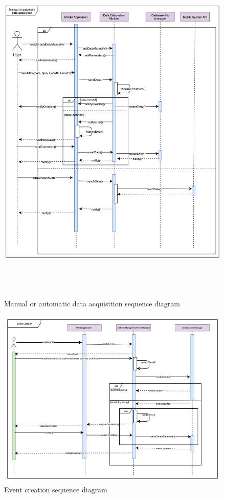 \begin{figure}[h!]
\centering
\includegraphics[height=17.00cm,keepaspectratio]{Figures/DataAcquisition}
\caption{Manual or automatic data acquisition sequence diagram}
\end{figure}

\begin{figure}
\centering
\includegraphics[width=\textwidth]{Figures/EventCreation}
\caption{Event creation sequence diagram}
\end{figure}



